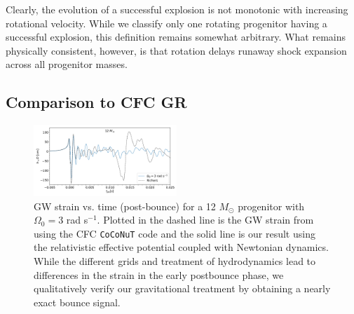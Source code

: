 \documentclass[twocolumn,times]{aastex62}  %
\begin{document}
Clearly, the evolution of a successful explosion is not monotonic with increasing rotational velocity.  While we classify only one rotating progenitor having a successful explosion, this definition remains somewhat arbitrary.  What remains physically consistent, however, is that rotation delays runaway shock expansion across all progenitor masses.

\subsection{Comparison to CFC GR}

 \begin{figure}[t]
    \centering
    \includegraphics[width=0.48\textwidth]{figures/bounce_richers.pdf}
    \caption{GW strain vs. time (post-bounce) for a 12 \(M_\odot\) progenitor with $\Omega_0 = 3$ rad s$^{-1}$.  Plotted in the dashed line is the GW strain from \citet{richers:2017} using the CFC \texttt{CoCoNuT} code and the solid line is our result using the relativistic effective potential coupled with Newtonian dynamics.  While the different grids and treatment of hydrodynamics lead to differences in the strain in the early postbounce phase, we qualitatively verify our gravitational treatment by obtaining a nearly exact bounce signal. }
    \label{fig:bounce_cfc}
\end{figure}
\end{document}
